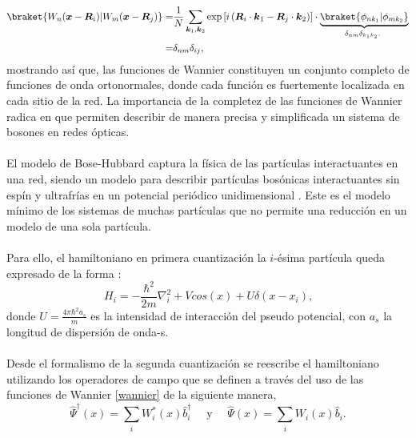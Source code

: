 \small
\begin{equation}
\begin{aligned} \label{wannier2}
\braket{W_n (\boldsymbol{x}-\boldsymbol{R}_i) | W_m (\boldsymbol{x}-\boldsymbol{R}_j)} = &  \frac{1}{N}  \sum_{\boldsymbol{k}_1, \boldsymbol{k}_2} \exp \left[ i \left(\boldsymbol{R}_i \cdot \boldsymbol{k}_1-\boldsymbol{R}_j \cdot \boldsymbol{k}_2 \right)   \right] \cdot \underbrace{  \braket{\phi_{n k_1} | \phi_{m k_2}}     }_{\text {$\delta_{n m} \delta_{k_1 k_2}$. }} \\
 = & \delta_{n m} \delta_{i j}\text {,}
\end{aligned}
\end{equation}
mostrando así que, las funciones de Wannier constituyen un conjunto completo de funciones de onda ortonormales, donde cada función es fuertemente localizada en cada sitio de la red. La importancia de la completez de las funciones de Wannier radica en que permiten describir de manera precisa y simplificada un sistema de bosones en redes ópticas.\\ \\
El modelo de Bose-Hubbard captura la física de las partículas interactuantes en una red, siendo un modelo para describir partículas bosónicas interactuantes sin espín y ultrafrías en un potencial periódico unidimensional \cite{Art_Phase_1D_Bosse_Hubbard_Model}. Este es el modelo mínimo de los sistemas de muchas partículas que no permite una reducción en un modelo de una sola partícula. \\ \\
Para ello, el hamiltoniano en primera cuantización la $i$-ésima partícula queda expresado de la forma \cite{Art_QUantum_Cell_Model_Boson_Bose_HUbbard}:
\begin{equation}
    H_i = -\frac{\hbar^2}{2m} \nabla_i^2 + V cos(x) + U \delta(x-x_i)\text {,}
\end{equation}
donde $U=\frac{4 \pi \hbar^2 a_s}{m}$ es la intensidad de interacción del pseudo potencial, con $a_s$ la longitud de dispersión de onda-s. \\ \\
Desde el formalismo de la segunda cuantización se reescribe el hamiltoniano utilizando los operadores de campo que se definen a través del uso de las funciones de Wannier \eqref{wannier} de la siguiente manera,
\begin{equation}
\hat{\Psi}^{\dagger}(x)=\sum_i W_i^*(x) \hat{b}_i^{\dagger} \quad \text { y } \quad \hat{\Psi}(x)=\sum_i W_i(x) \hat{b}_i\text {.}
\end{equation}
